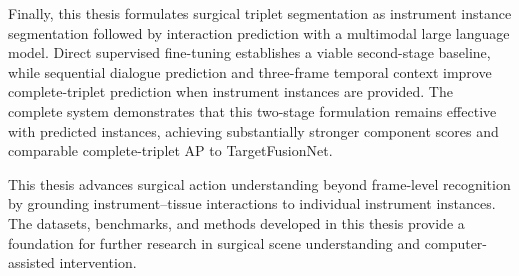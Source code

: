 Finally, this thesis formulates surgical triplet segmentation as instrument instance segmentation followed by interaction prediction with a multimodal large language model. Direct supervised fine-tuning establishes a viable second-stage baseline, while sequential dialogue prediction and three-frame temporal context improve complete-triplet prediction when instrument instances are provided. The complete system demonstrates that this two-stage formulation remains effective with predicted instances, achieving substantially stronger component scores and comparable complete-triplet AP to TargetFusionNet.

This thesis advances surgical action understanding beyond frame-level recognition by grounding instrument--tissue interactions to individual instrument instances. The datasets, benchmarks, and methods developed in this thesis provide a foundation for further research in surgical scene understanding and computer-assisted intervention.
